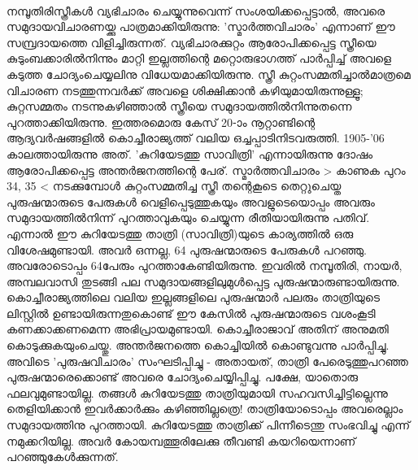 \label{ch11box2} %
\begin{tcolorbox}[%
  breakable, %
  arc=0mm, 
  left=1pt, right = 1pt, 
  boxrule=0mm,
  colback = {blue!10}, %
] 

\paragraph{}നമ്പൂതിരിസ്ത്രീകൾ വ്യഭിചാരം ചെയ്യുന്നുവെന്ന് സംശയിക്കപ്പെട്ടാൽ, അവരെ സമുദായവിചാരണയ്ക്കു പാത്രമാക്കിയിരുന്നു: 'സ്മാർത്തവിചാരം' എന്നാണ് ഈ സമ്പ്രദായത്തെ വിളിച്ചിരുന്നത്. വ്യഭിചാരക്കുറ്റം ആരോപിക്കപ്പെട്ട സ്ത്രീയെ കുടുംബക്കാരിൽനിന്നും മാറ്റി ഇല്ലത്തിന്റെ മറ്റൊരുഭാഗത്ത് പാർപ്പിച്ച് അവളെ കടുത്ത ചോദ്യംചെയ്യലിനു വിധേയമാക്കിയിരുന്നു. സ്ത്രീ കുറ്റംസമ്മതിച്ചാൽമാത്രമെ വിചാരണ നടത്തുന്നവർക്ക് അവളെ ശിക്ഷിക്കാൻ കഴിയുമായിരുന്നുള്ളൂ; കുറ്റസമ്മതം നടന്നുകഴിഞ്ഞാൽ സ്ത്രീയെ സമുദായത്തിൽനിന്നുതന്നെ പുറത്താക്കിയിരുന്നു.
ഇത്തരമൊരു കേസ് 20-ാം നൂറ്റാണ്ടിന്റെ ആദ്യവർഷങ്ങളിൽ കൊച്ചീരാജ്യത്ത് വലിയ ഒച്ചപ്പാടിനിടവരുത്തി. 1905-'06 കാലത്തായിരുന്നു അത്. 'കുറിയേടത്തു സാവിത്രി' എന്നായിരുന്നു ദോഷം ആരോപിക്കപ്പെട്ട അന്തർജനത്തിന്റെ പേര്. സ്മാർത്തവിചാരം > കാണുക പുറം 34, 35 < നടക്കുമ്പോൾ കുറ്റംസമ്മതിച്ച സ്ത്രീ തന്റെകൂടെ തെറ്റുചെയ്ത പുരുഷന്മാരുടെ പേരുകൾ വെളിപ്പെടുത്തുകയും അവളുടെയൊപ്പം അവരും സമുദായത്തിൽനിന്ന് പുറത്താവുകയും ചെയ്യുന്ന രീതിയായിരുന്നു പതിവ്. എന്നാൽ ഈ കുറിയേടത്തു താത്രി (സാവിത്രി)യുടെ കാര്യത്തിൽ ഒരു വിശേഷമുണ്ടായി. അവർ ഒന്നല്ല, 64 പുരുഷന്മാരുടെ പേരുകൾ പറഞ്ഞു. അവരോടൊപ്പം 64പേരും പുറത്താകേണ്ടിയിരുന്നു. ഇവരിൽ നമ്പൂതിരി, നായർ, അമ്പലവാസി തുടങ്ങി പല സമുദായങ്ങളിലുമുൾപ്പെട്ട പുരുഷന്മാരുണ്ടായിരുന്നു. കൊച്ചീരാജ്യത്തിലെ വലിയ ഇല്ലങ്ങളിലെ പുരുഷന്മാർ പലരും താത്രിയുടെ ലിസ്റ്റിൽ ഉണ്ടായിരുന്നതുകൊണ്ട് ഈ കേസിൽ പുരുഷന്മാരുടെ വശംകൂടി കണക്കാക്കണമെന്ന അഭിപ്രായമുണ്ടായി. കൊച്ചീരാജാവ് അതിന് അനുമതി കൊടുക്കുകയുംചെയ്തു. അന്തർജനത്തെ കൊച്ചിയിൽ കൊണ്ടുവന്നു പാർപ്പിച്ചു. അവിടെ 'പുരുഷവിചാരം' സംഘടിപ്പിച്ചു - അതായത്, താത്രി പേരെടുത്തുപറഞ്ഞ പുരുഷന്മാരെക്കൊണ്ട് അവരെ ചോദ്യംചെയ്യിപ്പിച്ചു. പക്ഷേ, യാതൊരു ഫലവുമുണ്ടായില്ല. തങ്ങൾ കുറിയേടത്തു താത്രിയുമായി സഹവസിച്ചിട്ടില്ലെന്നു തെളിയിക്കാൻ ഇവർക്കാർക്കും കഴിഞ്ഞില്ലത്രെ! താത്രിയോടൊപ്പം അവരെല്ലാം സമുദായത്തിനു പുറത്തായി.
കുറിയേടത്തു താത്രിക്ക് പിന്നീടെന്തു സംഭവിച്ചു എന്ന് നമുക്കറിയില്ല. അവർ കോയമ്പത്തൂരിലേക്കു തീവണ്ടി കയറിയെന്നാണ് പറഞ്ഞുകേൾക്കുന്നത്.
\end{tcolorbox}


\label{ch11box3} %
\begin{tcolorbox}[%
 breakable, %
  arc=0mm, 
  left=1pt, right = 1pt, 
  boxrule=0mm,
  colback = {blue!10}, %
] 
\end{tcolorbox}

